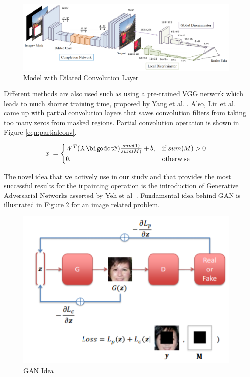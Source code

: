 \begin{figure}[h!]
    \centering
    \includegraphics[scale=0.35]{figures/chapter4/Lizukaetal.PNG}
    \vspace*{5mm}
    \caption{Model with Dilated Convolution Layer \cite{dilated_conv}}
    \label{fig:dilated-model}
\end{figure}

Different methods are also used such as using a pre-trained VGG network which leads to much shorter training time, proposed by Yang et al. \cite{inpainting_neuralpatch}. Also, Liu et al. \cite{richer_conv_edge} came up with partial convolution layers that saves convolution filters from taking too many zeros from masked regions. Partial convolution operation is shown in Figure \ref{eqn:partialconv}.

\begin{equation}
\label{eqn:partialconv}
    x^{'}= {
\begin{cases}
    W^T (X\bigodotM) \frac{sum(1)}{sum(M)}+b,& \text{if } sum(M) > 0\\
    0,              & \text{otherwise}
\end{cases}
}
\end{equation}

The novel idea that we actively use in our study and that provides the most successful results for the inpainting operation is the introduction of Generative Adversarial Networks asserted by Yeh et al. \cite{semantic_inpainting_geneative}. Fundamental idea behind GAN is illustrated in Figure \ref{fig:gan-idedal} for an image related problem.

\begin{figure}[h!]
    \centering
    \includegraphics[scale=0.7]{figures/chapter4/GANinpainting.PNG}
    \caption{GAN Idea \cite{semantic_inpainting_geneative}}
    \label{fig:gan-idedal}
\end{figure}

